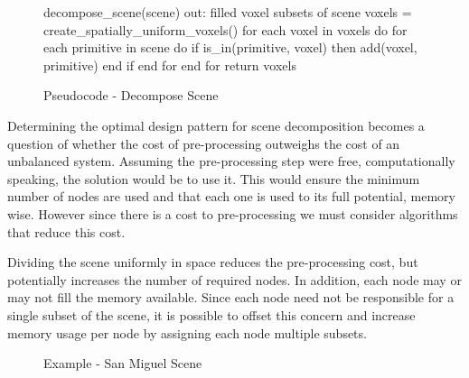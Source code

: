 \begin{figure}[!htb]
\begin{algorithm}
decompose_scene(scene)
  out: filled voxel subsets of scene
  voxels = create_spatially_uniform_voxels()
  for each voxel in voxels do
    for each primitive in scene do
      if is_in(primitive, voxel) then
        add(voxel, primitive)
      end if
    end for
  end for
return voxels
\end{algorithm}
\caption{Pseudocode - Decompose Scene}
\label{fig:decompose-scene}
\end{figure}

Determining the optimal design pattern for scene decomposition becomes a
question of whether the cost of pre-processing outweighs the cost of an unbalanced 
system.  Assuming the pre-processing step were free, computationally speaking, 
the solution would be to use it.  This would ensure the minimum number of
nodes are used and that each one is used to its full potential, memory wise.  
However since there is a cost to pre-processing we must consider algorithms that
reduce this cost.  

Dividing the scene uniformly in space reduces the pre-processing cost, but 
potentially increases the number of required nodes.  In addition, each node may 
or may not fill the memory available.  Since each node need not be responsible 
for a single subset of the scene, it is possible to offset this concern and 
increase memory usage per node by assigning each node multiple subsets.

\begin{figure}[!htb]
\centering
\noindent{}
\caption{Example - San Miguel Scene}
\label{fig:san_miguel}
\end{figure}

